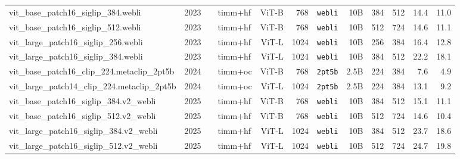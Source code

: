 \begin{tabular}{llllrrrrrrRR}
vit\_base\_patch16\_siglip\_384.webli             & 2023 & \cite{siglip}          & timm+hf & ViT-B & 768  & \texttt{webli}    & 10B   & 384 & 512 & 14.4 & 11.0 \\
vit\_base\_patch16\_siglip\_512.webli             & 2023 & \cite{siglip}          & timm+hf & ViT-B & 768  & \texttt{webli}    & 10B   & 512 & 724 & 14.6 & 11.1 \\
vit\_large\_patch16\_siglip\_256.webli            & 2023 & \cite{siglip}          & timm+hf & ViT-L & 1024 & \texttt{webli}    & 10B   & 256 & 384 & 16.4 & 12.8 \\
vit\_large\_patch16\_siglip\_384.webli            & 2023 & \cite{siglip}          & timm+hf & ViT-L & 1024 & \texttt{webli}    & 10B   & 384 & 512 & 22.2 & 18.1 \\
vit\_base\_patch16\_clip\_224.metaclip\_2pt5b     & 2024 & \cite{metaclip}        & timm+oc & ViT-B & 768  & \texttt{2pt5b}    & 2.5B  & 224 & 384 & 7.6  & 4.9  \\
vit\_large\_patch14\_clip\_224.metaclip\_2pt5b    & 2024 & \cite{metaclip}        & timm+oc & ViT-L & 1024 & \texttt{2pt5b}    & 2.5B  & 224 & 384 & 13.1 & 9.2  \\
vit\_base\_patch16\_siglip\_384.v2\_webli         & 2025 & \cite{siglip2}         & timm+hf & ViT-B & 768  & \texttt{webli}    & 10B   & 384 & 512 & 15.1 & 11.1 \\
vit\_base\_patch16\_siglip\_512.v2\_webli         & 2025 & \cite{siglip2}         & timm+hf & ViT-B & 768  & \texttt{webli}    & 10B   & 512 & 724 & 14.6 & 10.4 \\
vit\_large\_patch16\_siglip\_384.v2\_webli        & 2025 & \cite{siglip2}         & timm+hf & ViT-L & 1024 & \texttt{webli}    & 10B   & 384 & 512 & 23.7 & 18.6 \\
vit\_large\_patch16\_siglip\_512.v2\_webli        & 2025 & \cite{siglip2}         & timm+hf & ViT-L & 1024 & \texttt{webli}    & 10B   & 512 & 724 & 24.7 & 19.8 \\
\bottomrule
\end{tabular}